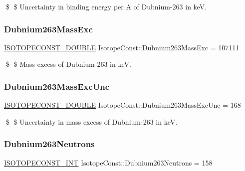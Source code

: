 \$ \$ Uncertainty in binding energy per A of Dubnium-\/263 in keV. \mbox{\label{group___isotope_const-_dubnium-_db263_gae6c954405900e9abec8f7710cf95724c}} 
\subsubsection{\texorpdfstring{Dubnium263\+Mass\+Exc}{Dubnium263MassExc}}
{\footnotesize\ttfamily \mbox{\hyperlink{group___isotope_const-_macros_ga8f45a7272ce02c0b4c65c44636ed719a}{I\+S\+O\+T\+O\+P\+E\+C\+O\+N\+S\+T\+\_\+\+D\+O\+U\+B\+LE}} Isotope\+Const\+::\+Dubnium263\+Mass\+Exc = 107111}

\$ \$ Mass excess of Dubnium-\/263 in keV. \mbox{\label{group___isotope_const-_dubnium-_db263_gac926d7c9d613b652348cdcacf5da39e1}} 
\subsubsection{\texorpdfstring{Dubnium263\+Mass\+Exc\+Unc}{Dubnium263MassExcUnc}}
{\footnotesize\ttfamily \mbox{\hyperlink{group___isotope_const-_macros_ga8f45a7272ce02c0b4c65c44636ed719a}{I\+S\+O\+T\+O\+P\+E\+C\+O\+N\+S\+T\+\_\+\+D\+O\+U\+B\+LE}} Isotope\+Const\+::\+Dubnium263\+Mass\+Exc\+Unc = 168}

\$ \$ Uncertainty in mass excess of Dubnium-\/263 in keV. \mbox{\label{group___isotope_const-_dubnium-_db263_gaa0943b2b0eabb1a188c7a60f1567c52c}} 
\subsubsection{\texorpdfstring{Dubnium263\+Neutrons}{Dubnium263Neutrons}}
{\footnotesize\ttfamily \mbox{\hyperlink{group___isotope_const-_macros_ga5f18360b3e99483a35c32d789e62621c}{I\+S\+O\+T\+O\+P\+E\+C\+O\+N\+S\+T\+\_\+\+I\+NT}} Isotope\+Const\+::\+Dubnium263\+Neutrons = 158}

